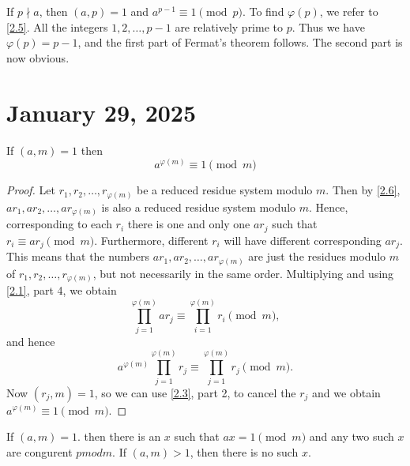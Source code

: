 \documentclass[11pt]{article}
\begin{document}
\begin{theorem}\label{2.7}
	If \(p \nmid a\), then \((a, p) = 1\) and \(a^{p-1} \equiv 1 \pmod{p}\). To find \(\varphi(p)\), we refer to \cref{2.5}. All the integers \(1, 2, \ldots, p - 1\) are relatively prime to \(p\). Thus we have \(\varphi(p) = p - 1\), and the first part of Fermat's theorem follows. The second part is now obvious.

\end{theorem}

\section{January 29, 2025}
\begin{theorem}\label{2.8}
	If \((a, m) = 1\) then \[a^{\varphi(m)} \equiv 1\pmod{m}\]
\end{theorem}
\begin{proof}
	Let \(r_1, r_2, \ldots, r_{\varphi(m)}\) be a reduced residue system modulo \(m\). Then by \cref{2.6}, \(ar_1, ar_2, \ldots, ar_{\varphi(m)}\) is also a reduced residue system modulo \(m\). Hence, corresponding to each \(r_i\) there is one and only one \(ar_j\) such that \(r_i \equiv ar_j \pmod{m}\). Furthermore, different \(r_i\) will have different corresponding \(ar_j\). This means that the numbers \(ar_1, ar_2, \ldots, ar_{\varphi(m)}\) are just the residues modulo \(m\) of \(r_1, r_2, \ldots, r_{\varphi(m)}\), but not necessarily in the same order. Multiplying and using \cref{2.1}, part 4, we obtain
	\[
		\prod_{j=1}^{\varphi(m)} ar_j \equiv \prod_{i=1}^{\varphi(m)} r_i \pmod{m},
	\]
	and hence
	\[
		a^{\varphi(m)} \prod_{j=1}^{\varphi(m)} r_j \equiv \prod_{j=1}^{\varphi(m)} r_j \pmod{m}.
	\]
	Now \((r_j, m) = 1\), so we can use \cref{2.3}, part 2, to cancel the \(r_j\)
	and we obtain \(a^{\varphi(m)} \equiv 1 \pmod{m}\).
\end{proof}

\begin{theorem}\label{2.9}
	If \((a, m) = 1\). then there is an \(x\) such that \(ax = 1 \pmod{m}\) and any two such \(x\) are congurent \(pmod{m}\). If \((a, m) > 1\), then there is no such \(x\).
\end{theorem}
\end{document}
